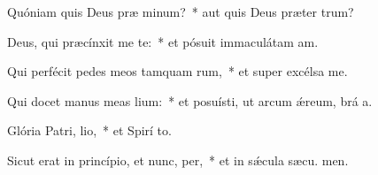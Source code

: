 \item Quóniam quis Deus præ minum?~* aut quis Deus præter  trum?
\item Deus, qui præcínxit me te:~* et pósuit immaculátam  am.
\item Qui perfécit pedes meos tamquam rum,~* et super excélsa  me.
\item Qui docet manus meas  lium:~* et posuísti, ut arcum ǽreum, brá a.
\item Glória Patri,  lio,~* et Spirí to.
\item Sicut erat in princípio, et nunc,  per,~* et in sǽcula sæcu. men.
